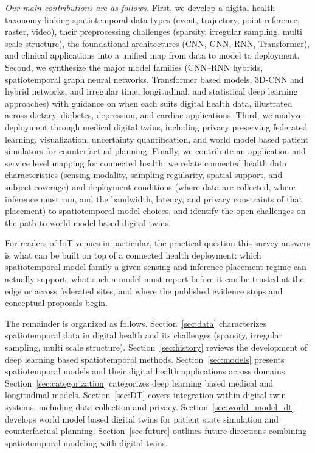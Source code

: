\documentclass[journal]{IEEEtran}
\begin{document}
\emph{Our main contributions are as follows.} First, we develop a digital health taxonomy linking spatiotemporal data types (event, trajectory, point reference, raster, video), their preprocessing challenges (sparsity, irregular sampling, multi scale structure), the foundational architectures (CNN, GNN, RNN, Transformer), and clinical applications into a unified map from data to model to deployment. Second, we synthesize the major model families (CNN--RNN hybrids, spatiotemporal graph neural networks, Transformer based models, 3D-CNN and hybrid networks, and irregular time, longitudinal, and statistical deep learning approaches) with guidance on when each suits digital health data, illustrated across dietary, diabetes, depression, and cardiac applications. Third, we analyze deployment through medical digital twins, including privacy preserving federated learning, visualization, uncertainty quantification, and world model based patient simulators for counterfactual planning. Finally, we contribute an application and service level mapping for connected health: we relate connected health data characteristics (sensing modality, sampling regularity, spatial support, and subject coverage) and deployment conditions (where data are collected, where inference must run, and the bandwidth, latency, and privacy constraints of that placement) to spatiotemporal model choices, and identify the open challenges on the path to world model based digital twins.



For readers of IoT venues in particular, the practical question this survey answers is what can be built on top of a connected health deployment: which spatiotemporal model family a given sensing and inference placement regime can actually support, what such a model must report before it can be trusted at the edge or across federated sites, and where the published evidence stops and conceptual proposals begin.

The remainder is organized as follows. Section~\ref{sec:data} characterizes spatiotemporal data in digital health and its challenges (sparsity, irregular sampling, multi scale structure). Section~\ref{sec:history} reviews the development of deep learning based spatiotemporal methods. Section~\ref{sec:models} presents spatiotemporal models and their digital health applications across domains. Section~\ref{sec:categorization} categorizes deep learning based medical and longitudinal models. Section~\ref{sec:DT} covers integration within digital twin systems, including data collection and privacy. Section~\ref{sec:world_model_dt} develops world model based digital twins for patient state simulation and counterfactual planning. Section~\ref{sec:future} outlines future directions combining spatiotemporal modeling with digital twins.
\end{document}
